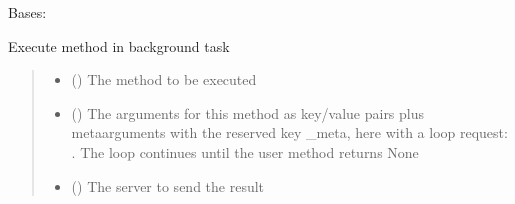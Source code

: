 \documentclass[letterpaper,10pt,english]{sphinxmanual}
\begin{document}
\begin{savenotes}\begin{fulllineitems}
\label{\detokenize{eezz:eezz.websocket.TAsyncHandler}}
\pysigstartsignatures
{}
\pysigstopsignatures
\sphinxAtStartPar
Bases: 

\sphinxAtStartPar
Execute method in background task
\begin{quote}\begin{description}
\begin{itemize}
\item {} 
\sphinxAtStartPar
{} () \textendash{} The method to be executed

\item {} 
\sphinxAtStartPar
{} (\sphinxstyleliteralemphasis{\sphinxupquote{{[}}}\sphinxstyleliteralemphasis{\sphinxupquote{, }}\sphinxstyleliteralemphasis{\sphinxupquote{{]}}}) \textendash{} The arguments for this method as key/value pairs plus meta\sphinxhyphen{}arguments with the reserved key    \_meta, here with a loop request: .     The loop continues until the user method returns None

\item {} 
\sphinxAtStartPar
{} ({\hyperref[\detokenize{eezz:eezz.websocket.TWebSocketClient}]{}}) \textendash{} The server to send the result


\end{itemize}
\end{description}
\end{quote}
\end{fulllineitems}
\end{savenotes}
\end{document}
